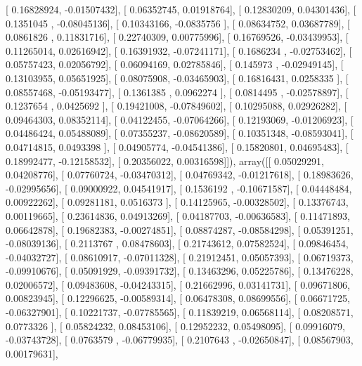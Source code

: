 \documentclass{article}
\begin{document}
       [ 0.16828924, -0.01507432],
       [ 0.06352745,  0.01918764],
       [ 0.12830209,  0.04301436],
       [ 0.1351045 , -0.08045136],
       [ 0.10343166, -0.0835756 ],
       [ 0.08634752,  0.03687789],
       [ 0.0861826 ,  0.11831716],
       [ 0.22740309,  0.00775996],
       [ 0.16769526, -0.03439953],
       [ 0.11265014,  0.02616942],
       [ 0.16391932, -0.07241171],
       [ 0.1686234 , -0.02753462],
       [ 0.05757423,  0.02056792],
       [ 0.06094169,  0.02785846],
       [ 0.145973  , -0.02949145],
       [ 0.13103955,  0.05651925],
       [ 0.08075908, -0.03465903],
       [ 0.16816431,  0.0258335 ],
       [ 0.08557468, -0.05193477],
       [ 0.1361385 ,  0.0962274 ],
       [ 0.0814495 , -0.02578897],
       [ 0.1237654 ,  0.0425692 ],
       [ 0.19421008, -0.07849602],
       [ 0.10295088,  0.02926282],
       [ 0.09464303,  0.08352114],
       [ 0.04122455, -0.07064266],
       [ 0.12193069, -0.01206923],
       [ 0.04486424,  0.05488089],
       [ 0.07355237, -0.08620589],
       [ 0.10351348, -0.08593041],
       [ 0.04714815,  0.0493398 ],
       [ 0.04905774, -0.04541386],
       [ 0.15820801,  0.04695483],
       [ 0.18992477, -0.12158532],
       [ 0.20356022,  0.00316598]]), array([[ 0.05029291,  0.04208776],
       [ 0.07760724, -0.03470312],
       [ 0.04769342, -0.01217618],
       [ 0.18983626, -0.02995656],
       [ 0.09000922,  0.04541917],
       [ 0.1536192 , -0.10671587],
       [ 0.04448484,  0.00922262],
       [ 0.09281181,  0.0516373 ],
       [ 0.14125965, -0.00328502],
       [ 0.13376743,  0.00119665],
       [ 0.23614836,  0.04913269],
       [ 0.04187703, -0.00636583],
       [ 0.11471893,  0.06642878],
       [ 0.19682383, -0.00274851],
       [ 0.08874287, -0.08584298],
       [ 0.05391251, -0.08039136],
       [ 0.2113767 ,  0.08478603],
       [ 0.21743612,  0.07582524],
       [ 0.09846454, -0.04032727],
       [ 0.08610917, -0.07011328],
       [ 0.21912451,  0.05057393],
       [ 0.06719373, -0.09910676],
       [ 0.05091929, -0.09391732],
       [ 0.13463296,  0.05225786],
       [ 0.13476228,  0.02006572],
       [ 0.09483608, -0.04243315],
       [ 0.21662996,  0.03141731],
       [ 0.09671806,  0.00823945],
       [ 0.12296625, -0.00589314],
       [ 0.06478308,  0.08699556],
       [ 0.06671725, -0.06327901],
       [ 0.10221737, -0.07785565],
       [ 0.11839219,  0.06568114],
       [ 0.08208571,  0.0773326 ],
       [ 0.05824232,  0.08453106],
       [ 0.12952232,  0.05498095],
       [ 0.09916079, -0.03743728],
       [ 0.0763579 , -0.06779935],
       [ 0.2107643 , -0.02650847],
       [ 0.08567903,  0.00179631],
\end{document}
